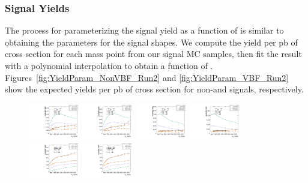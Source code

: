 \subsubsection{Signal Yields}

The process for parameterizing the signal yield as a function of \MX is similar to obtaining the parameters for the signal shapes.
We compute the yield per pb of cross section for each mass point from our signal MC samples, then fit the result with a polynomial interpolation to obtain a function of \MX.
Figures~\ref{fig:YieldParam_NonVBF_Run2} and \ref{fig:YieldParam_VBF_Run2} show the expected yields per pb of cross section for non-\VBF and \VBF signals, respectively.

\begin{figure}[htbp]
  \centering
  \includegraphics[width=0.2\textwidth]{fig/2Dfit/paramSignalYield_NonVBFSig_mu_HP_bb_LDy.pdf}
  \includegraphics[width=0.2\textwidth]{fig/2Dfit/paramSignalYield_NonVBFSig_e_HP_bb_LDy.pdf}
  \includegraphics[width=0.2\textwidth]{fig/2Dfit/paramSignalYield_NonVBFSig_mu_LP_bb_LDy.pdf}
  \includegraphics[width=0.2\textwidth]{fig/2Dfit/paramSignalYield_NonVBFSig_e_LP_bb_LDy.pdf}\\
  \includegraphics[width=0.2\textwidth]{fig/2Dfit/paramSignalYield_NonVBFSig_mu_HP_nobb_LDy.pdf}
  \includegraphics[width=0.2\textwidth]{fig/2Dfit/paramSignalYield_NonVBFSig_e_HP_nobb_LDy.pdf}

\end{figure}
